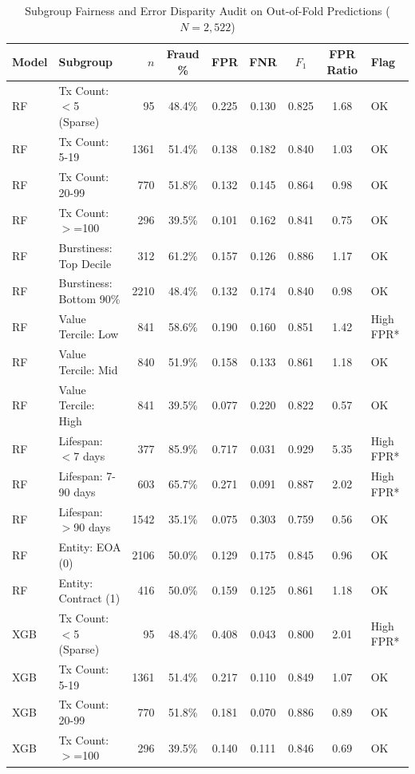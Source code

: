 \begin{table}[!htbp]
\centering
\caption{Subgroup Fairness and Error Disparity Audit on Out-of-Fold Predictions ($N=2{,}522$)}
\label{tab:bias_subgroups}
\footnotesize
\begin{tabularx}{\textwidth}{l l r c c c c c l}
\toprule
\textbf{Model} & \textbf{Subgroup} & \textbf{$n$} & \textbf{Fraud \%} & \textbf{FPR} & \textbf{FNR} & \textbf{$F_1$} & \textbf{FPR Ratio} & \textbf{Flag} \\
\midrule
RF & Tx Count: $<$5 (Sparse) & 95 & 48.4\% & 0.225 & 0.130 & 0.825 & 1.68 & OK \\
RF & Tx Count: 5-19 & 1361 & 51.4\% & 0.138 & 0.182 & 0.840 & 1.03 & OK \\
RF & Tx Count: 20-99 & 770 & 51.8\% & 0.132 & 0.145 & 0.864 & 0.98 & OK \\
RF & Tx Count: $>$=100 & 296 & 39.5\% & 0.101 & 0.162 & 0.841 & 0.75 & OK \\
RF & Burstiness: Top Decile & 312 & 61.2\% & 0.157 & 0.126 & 0.886 & 1.17 & OK \\
RF & Burstiness: Bottom 90\% & 2210 & 48.4\% & 0.132 & 0.174 & 0.840 & 0.98 & OK \\
RF & Value Tercile: Low & 841 & 58.6\% & 0.190 & 0.160 & 0.851 & 1.42 & High FPR* \\
RF & Value Tercile: Mid & 840 & 51.9\% & 0.158 & 0.133 & 0.861 & 1.18 & OK \\
RF & Value Tercile: High & 841 & 39.5\% & 0.077 & 0.220 & 0.822 & 0.57 & OK \\
RF & Lifespan: $<$7 days & 377 & 85.9\% & 0.717 & 0.031 & 0.929 & 5.35 & High FPR* \\
RF & Lifespan: 7-90 days & 603 & 65.7\% & 0.271 & 0.091 & 0.887 & 2.02 & High FPR* \\
RF & Lifespan: $>$90 days & 1542 & 35.1\% & 0.075 & 0.303 & 0.759 & 0.56 & OK \\
RF & Entity: EOA (0) & 2106 & 50.0\% & 0.129 & 0.175 & 0.845 & 0.96 & OK \\
RF & Entity: Contract (1) & 416 & 50.0\% & 0.159 & 0.125 & 0.861 & 1.18 & OK \\
XGB & Tx Count: $<$5 (Sparse) & 95 & 48.4\% & 0.408 & 0.043 & 0.800 & 2.01 & High FPR* \\
XGB & Tx Count: 5-19 & 1361 & 51.4\% & 0.217 & 0.110 & 0.849 & 1.07 & OK \\
XGB & Tx Count: 20-99 & 770 & 51.8\% & 0.181 & 0.070 & 0.886 & 0.89 & OK \\
XGB & Tx Count: $>$=100 & 296 & 39.5\% & 0.140 & 0.111 & 0.846 & 0.69 & OK \\

\end{tabularx}
\end{table}

